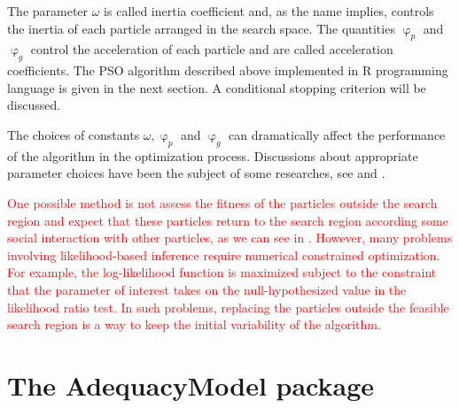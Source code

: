 \documentclass[10pt,letterpaper]{article}
\begin{document}
The parameter $\omega$ is called inertia coefficient and, as the name implies, controls the inertia of each particle arranged in the search space. The quantities $\upvarphi_p$ and $\upvarphi_g$ control the acceleration of each particle and are called acceleration coefficients. The PSO algorithm described
above implemented in \textsc{R} programming language is given in the next section. A conditional stopping criterion will be discussed.

The choices of constants $\omega, \upvarphi_p$ and $\upvarphi_g$ can dramatically affect the performance of the algorithm in the optimization process. Discussions about appropriate parameter choices have been the subject of some researches, see \cite{kennedyetal2001} and \cite{bratton2008simplified}.

\textcolor{red}{One possible method is not assess the fitness of the particles outside the search region and expect that these particles return to the search region according some social interaction with other particles, as we can see in \cite{brattonkennedy2007}. However, many problems involving likelihood-based inference require numerical constrained optimization. For example, the log-likelihood function is maximized subject to the constraint that the parameter of interest takes on the null-hypothesized value in the likelihood ratio test. In such problems, replacing the particles outside the feasible search region is a way to keep the initial variability of the algorithm.}

\section{The AdequacyModel package}
\end{document}
